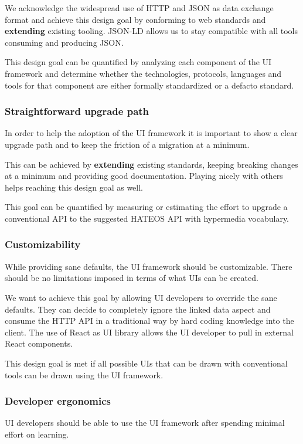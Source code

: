 We acknowledge the widespread use of HTTP and JSON as data exchange format and achieve this design goal by conforming to web standards and \textbf{extending} existing tooling. JSON-LD allows us to stay compatible with all tools consuming and producing JSON.

This design goal can be quantified by analyzing each component of the UI framework and determine whether the technologies, protocols, languages and tools for that component are either formally standardized or a defacto standard.

\subsubsection{Straightforward upgrade path}
In order to help the adoption of the UI framework it is important to show a clear upgrade path and to keep the friction of a migration at a minimum.

This can be achieved by \textbf{extending} existing standards, keeping breaking changes at a minimum and providing good documentation. Playing nicely with others helps reaching this design goal as well.

This goal can be quantified by measuring or estimating the effort to upgrade a conventional API to the suggested HATEOS API with hypermedia vocabulary.

\subsubsection{Customizability}
While providing sane defaults, the UI framework should be customizable. There should be no limitations imposed in terms of what UIs can be created.

We want to achieve this goal by allowing UI developers to override the sane defaults. They can decide to completely ignore the linked data aspect and consume the HTTP API in a traditional way by hard coding knowledge into the client. The use of React as UI library allows the UI developer to pull in external React components.

This design goal is met if all possible UIs that can be drawn with conventional tools can be drawn using the UI framework.

\subsubsection{Developer ergonomics}
UI developers should be able to use the UI framework after spending minimal effort on learning.

